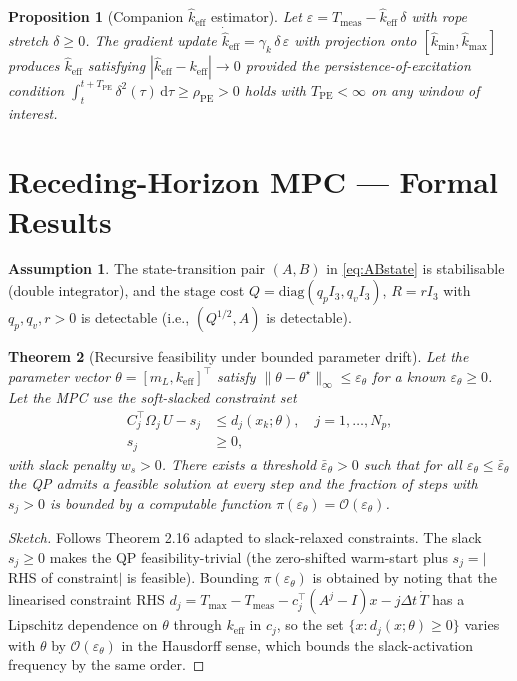 \documentclass[11pt,a4paper]{article}
\theoremstyle{plain}
\newtheorem{theorem}{Theorem}
\newtheorem{proposition}[theorem]{Proposition}
\theoremstyle{definition}
\newtheorem{assumption}{Assumption}
\begin{document}
\begin{proposition}[Companion $\hat k_\mathrm{eff}$ estimator]\label{prop:keff}
Let $\varepsilon = T_\mathrm{meas} - \hat k_\mathrm{eff}\,\delta$ with
rope stretch $\delta\ge 0$. The gradient update
$\dot{\hat k}_\mathrm{eff} = \gamma_k\, \delta\, \varepsilon$ with
projection onto $[\hat k_{\min},\hat k_{\max}]$ produces
$\hat k_\mathrm{eff}$ satisfying $|\hat k_\mathrm{eff}-k_\mathrm{eff}|\to 0$
provided the persistence-of-excitation condition
$\int_t^{t+T_\mathrm{PE}} \delta^2(\tau)\,\mathrm d\tau \ge \rho_\mathrm{PE}>0$
holds with $T_\mathrm{PE}<\infty$ on any window of interest.
\end{proposition}

\section{Receding-Horizon MPC --- Formal Results}
\label{sec:mpc}

\begin{assumption}\label{ass:mpc}
The state-transition pair $(A,B)$ in \eqref{eq:ABstate} is
stabilisable (double integrator), and the stage cost
$Q = \mathrm{diag}(q_p I_3, q_v I_3)$, $R = r I_3$ with
$q_p,q_v,r > 0$ is detectable (i.e., $(Q^{1/2}, A)$ is detectable).
\end{assumption}

\begin{theorem}[Recursive feasibility under bounded parameter drift]\label{thm:mpc-recfeas}
Let the parameter vector $\theta = [m_L, k_\mathrm{eff}]^\top$ satisfy
$\|\theta - \theta^\star\|_\infty \le \varepsilon_\theta$ for a known
$\varepsilon_\theta \ge 0$. Let the MPC use the soft-slacked
constraint set
\begin{align*}
 C_j^\top \Omega_j\, U - s_j &\le d_j(x_k;\theta),\quad j=1,\dots,N_p,\\
 s_j &\ge 0,
\end{align*}
with slack penalty $w_s>0$. There exists a threshold
$\bar\varepsilon_\theta > 0$ such that for all
$\varepsilon_\theta \le \bar\varepsilon_\theta$ the QP admits a
feasible solution at every step and the fraction of steps with
$s_j>0$ is bounded by a computable function
$\pi(\varepsilon_\theta) = \mathcal O(\varepsilon_\theta)$.
\end{theorem}

\begin{proof}[Sketch]
Follows \cite{RawlingsMayneDiehl} Theorem 2.16 adapted to
slack-relaxed constraints. The slack $s_j\ge 0$ makes the QP
feasibility-trivial (the zero-shifted warm-start plus $s_j = |$RHS of
constraint$|$ is feasible). Bounding $\pi(\varepsilon_\theta)$ is
obtained by noting that the linearised constraint RHS
$d_j = T_{\max} - T_\mathrm{meas} - c_j^\top (A^j-I) x - j\Delta t\,\dot T$
has a Lipschitz dependence on $\theta$ through $k_\mathrm{eff}$ in
$c_j$, so the set $\{x : d_j(x;\theta)\ge 0\}$ varies with
$\theta$ by $\mathcal O(\varepsilon_\theta)$ in the Hausdorff sense,
which bounds the slack-activation frequency by the same order.
\end{proof}
\end{document}
